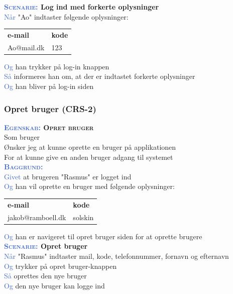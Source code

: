 \textbf{\textsc{\textcolor{RoyalBlue}{Scenarie:}} Log ind med forkerte oplysninger} \\
\textcolor{RoyalBlue}{Når} "Ao" indtaster følgende oplysninger:\\
\begin{tabular}{| l | l |}
	\textbf{e-mail} & \textbf{kode}\\
	Ao@mail.dk & 123\\
\end{tabular}
\newline \newline

\textcolor{RoyalBlue}{Og} han trykker på log-in knappen\\
\textcolor{RoyalBlue}{Så} informeres han om, at der er indtastet forkerte oplysninger\\
\textcolor{RoyalBlue}{Og} han bliver på log-in siden\\

\clearpage

\subsubsection{Opret bruger (CRS-2)} \label{sec:USOpretBruger}
\textbf{\textsc{\textcolor{RoyalBlue}{Egenskab:} Opret bruger}} \\
Som bruger\\
Ønsker jeg at kunne oprette en bruger på applikationen\\
For at kunne give en anden bruger adgang til systemet \\

\textcolor{RoyalBlue}{\textbf{\textsc{Baggrund:}}}\\
\textcolor{RoyalBlue}{Givet} at brugeren "Rasmus" er logget ind \\
\textcolor{RoyalBlue}{Og} han vil oprette en bruger med følgende oplysninger:\\
\begin{tabular}{| l | l |}
	\textbf{e-mail} & \textbf{kode} \\
	jakob@ramboell.dk & solskin\\
\end{tabular}
\newline \newline
\textcolor{RoyalBlue}{Og} han er navigeret til opret bruger siden for at oprette brugere  \\

\textbf{\textsc{\textcolor{RoyalBlue}{Scenarie:}} Opret bruger}\\
\textcolor{RoyalBlue}{Når} "Rasmus" indtaster mail, kode, telefonnummer, 
fornavn og efternavn \\
\textcolor{RoyalBlue}{Og} trykker på opret bruger-knappen\\
\textcolor{RoyalBlue}{Så} oprettes den nye bruger\\
\textcolor{RoyalBlue}{Og} den nye bruger kan logge ind\\

